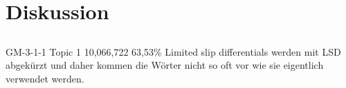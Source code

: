 \chapter{Diskussion}

\section{}
GM-3-1-1
Topic 1 
10,066,722	63,53\%
Limited slip differentials werden mit LSD abgekürzt und daher kommen die Wörter nicht so oft vor wie sie eigentlich verwendet werden.

